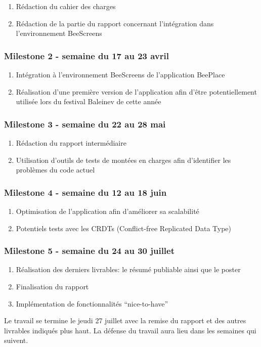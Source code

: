 \begin{enumerate}
  \item Rédaction du cahier des charges
  \item Rédaction de la partie du rapport concernant l'intégration dans l'environnement BeeScreens
\end{enumerate}

\subsubsection{Milestone 2 - semaine du 17 au 23 avril}

\begin{enumerate}
  \item Intégration à l'environnement BeeScreens de l'application BeePlace
  \item Réalisation d'une première version de l'application afin d'être potentiellement utilisée lors du festival Baleinev de cette année
\end{enumerate}

\subsubsection{Milestone 3 - semaine du 22 au 28 mai}

\begin{enumerate}
  \item Rédaction du rapport intermédiaire
  \item Utilisation d'outils de tests de montées en charges afin d'identifier les problèmes du code actuel
\end{enumerate}

\subsubsection{Milestone 4 - semaine du 12 au 18 juin}

\begin{enumerate}
  \item Optimisation de l'application afin d'améliorer sa scalabilité
  \item Potentiels tests avec les CRDTs (Conflict-free Replicated Data Type)
\end{enumerate}

\subsubsection{Milestone 5 - semaine du 24 au 30 juillet}

\begin{enumerate}
  \item Réalisation des derniers livrables: le résumé publiable ainsi que le poster
  \item Finalisation du rapport
  \item Implémentation de fonctionnalités “nice-to-have”
\end{enumerate}

Le travail se termine le jeudi 27 juillet avec la remise du rapport et des autres livrables indiqués plus haut. La défense du travail aura lieu dans les semaines qui suivent.
